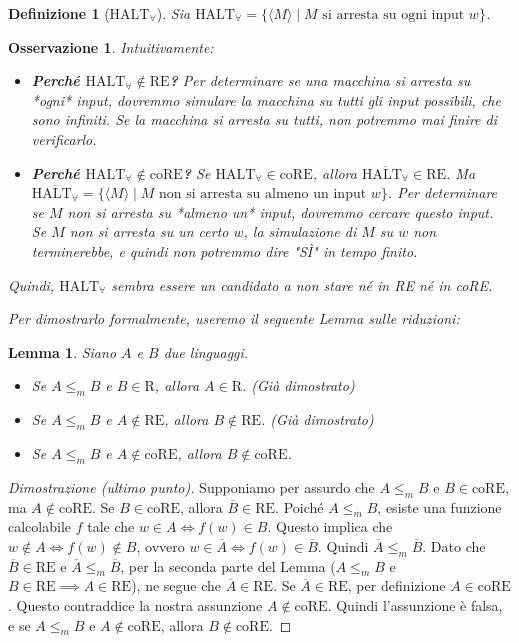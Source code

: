 \documentclass[a4paper, 11pt]{book} %
\newtheorem{definition}[theorem]{Definizione}
\newtheorem{lemma}[theorem]{Lemma}
\newtheorem{remark}[theorem]{Osservazione}
\theoremstyle{definition}
\begin{document}
\begin{definition}[$\text{HALT}_\forall$]
Sia $\text{HALT}_\forall = \{ \langle M \rangle \mid M \text{ si arresta su ogni input } w \}$.
\end{definition}

\begin{remark}
Intuitivamente:
\begin{itemize}
    \item \textbf{Perché $\text{HALT}_\forall \notin \text{RE}$?} Per determinare se una macchina si arresta su *ogni* input, dovremmo simulare la macchina su tutti gli input possibili, che sono infiniti. Se la macchina si arresta su tutti, non potremmo mai finire di verificarlo.
    \item \textbf{Perché $\text{HALT}_\forall \notin \text{coRE}$?} Se $\text{HALT}_\forall \in \text{coRE}$, allora $\overline{\text{HALT}_\forall} \in \text{RE}$. Ma $\overline{\text{HALT}_\forall} = \{ \langle M \rangle \mid M \text{ non si arresta su almeno un input } w \}$. Per determinare se $M$ non si arresta su *almeno un* input, dovremmo cercare questo input. Se $M$ non si arresta su un certo $w$, la simulazione di $M$ su $w$ non terminerebbe, e quindi non potremmo dire "SÌ" in tempo finito.
\end{itemize}
Quindi, $\text{HALT}_\forall$ sembra essere un candidato a non stare né in RE né in coRE.

Per dimostrarlo formalmente, useremo il seguente Lemma sulle riduzioni:
\end{remark}

\begin{lemma}
Siano $A$ e $B$ due linguaggi.
\begin{itemize}
    \item Se $A \le_m B$ e $B \in \text{R}$, allora $A \in \text{R}$. (Già dimostrato)
    \item Se $A \le_m B$ e $A \notin \text{RE}$, allora $B \notin \text{RE}$. (Già dimostrato)
    \item Se $A \le_m B$ e $A \notin \text{coRE}$, allora $B \notin \text{coRE}$.
\end{itemize}
\end{lemma}
\begin{proof}[Dimostrazione (ultimo punto)]
Supponiamo per assurdo che $A \le_m B$ e $B \in \text{coRE}$, ma $A \notin \text{coRE}$.
Se $B \in \text{coRE}$, allora $\overline{B} \in \text{RE}$.
Poiché $A \le_m B$, esiste una funzione calcolabile $f$ tale che $w \in A \iff f(w) \in B$.
Questo implica che $w \notin A \iff f(w) \notin B$, ovvero $w \in \overline{A} \iff f(w) \in \overline{B}$.
Quindi $\overline{A} \le_m \overline{B}$.
Dato che $\overline{B} \in \text{RE}$ e $\overline{A} \le_m \overline{B}$, per la seconda parte del Lemma ($A \le_m B$ e $B \in \text{RE} \implies A \in \text{RE}$), ne segue che $\overline{A} \in \text{RE}$.
Se $\overline{A} \in \text{RE}$, per definizione $A \in \text{coRE}$. Questo contraddice la nostra assunzione $A \notin \text{coRE}$.
Quindi l'assunzione è falsa, e se $A \le_m B$ e $A \notin \text{coRE}$, allora $B \notin \text{coRE}$.
\end{proof}
\end{document}
